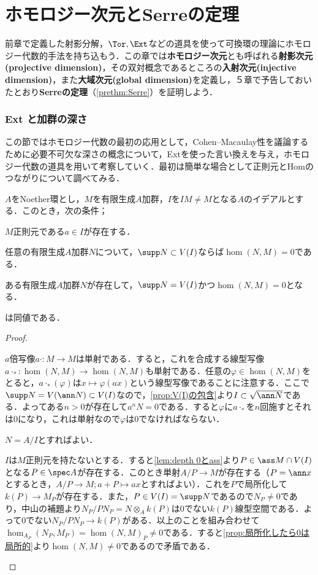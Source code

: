 \part[Homological dimension and Serre's theorem]{ホモロジー次元とSerreの定理}
前章で定義した射影分解，$\Tor,\Ext$などの道具を使って可換環の理論にホモロジー代数的手法を持ち込もう．この章では\textbf{ホモロジー次元}とも呼ばれる\textbf{射影次元(projective dimension)}，その双対概念であるところの\textbf{入射次元(injective dimension)}，また\textbf{大域次元(global dimension)}を定義し，５章で予告しておいたとおり\textbf{Serreの定理}（\ref{prethm:Serre}）を証明しよう．

\section{Ext と加群の深さ}
この節ではホモロジー代数の最初の応用として，Cohen--Macaulay性を議論するために必要不可欠な深さの概念について，Extを使った言い換えを与え，ホモロジー代数の道具を用いて考察していく．最初は簡単な場合として正則元とHomのつながりについて調べてみる．

\begin{lem}
	$A$をNoether環とし，$M$を有限生成$A$加群，$I$を$IM\neq M$となる$A$のイデアルとする．このとき，次の条件；
	\begin{sakura}
		\item $M$正則元である$a\in I$が存在する．
		\item 任意の有限生成$A$加群$N$について，$\supp N\subset V(I)$ならば$\hom(N,M)=0$である．
		\item ある有限生成$A$加群$N$が存在して，$\supp N=V(I)$かつ$\hom(N,M)=0$となる．
	\end{sakura}
	は同値である．
\end{lem}

\begin{proof}
	\begin{eqv}[3]
		\item $a$倍写像$a\cdot:M\to M$は単射である．すると，これを合成する線型写像$a\cdot_ \ast:\hom(N,M)\to\hom(N,M)$も単射である．任意の$\varphi\in\hom(N,M)$をとると，$a\cdot_\ast(\varphi)$は$x\mapsto \varphi(ax)$という線型写像であることに注意する．ここで$\supp N=V(\ann N)\subset V(I)$なので，\ref{prop:V(I)の包含}より$I\subset \sqrt{\ann N}$である．よってある$n>0$が存在して$a^nN=0$である．すると$\varphi$に$a\cdot_\ast$を$n$回施すとそれは$0$になり，これは単射なので$\varphi$は$0$でなければならない．
		\item $N=A/I$とすればよい．
		\item $I$は$M$正則元を持たないとする．すると\ref{lem:depth 0とass}より$P\in\ass M\cap V(I)$となる$P\in\spec A$が存在する．このとき単射$A/P\to M$が存在する（$P=\ann x$とするとき，$A/P\to M;a+P\mapsto ax$とすればよい）．これを$P$で局所化して$k(P)\to M_P$が存在する．また，$P\in V(I)=\supp N$であるので$N_P\neq 0$であり，中山の補題より$N_P/PN_P=N\otimes_A k(P)$は$0$でない$k(P)$線型空間である．よって$0$でない$N_P/PN_P\to k(P)$がある．以上のことを組み合わせて$\hom_{A_P}(N_P,M_P)=\hom(N,M)_P\neq0$である．すると\ref{prop:局所化したら0は局所的}より$\hom (N,M)\neq0$であるので矛盾である．
	\end{eqv}
\end{proof}

